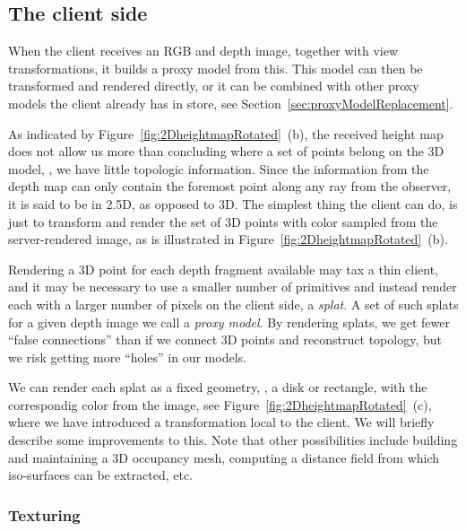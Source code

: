 \subsection{The client side}
\label{sec:client}

When the client receives an RGB and depth image, together with view
transformations, it builds a proxy model from this. This model can then be
transformed and rendered directly, or it can be combined with other proxy models
the client already has in store, see Section~\ref{sec:proxyModelReplacement}.

As indicated by Figure~\ref{fig:2DheightmapRotated}~(b), the received height map
does not allow us more than concluding where a set of points belong on the 3D
model, \ie, we have little topologic information. Since the information from the
depth map can only contain the foremost point along any ray from the observer,
it is said to be in 2.5D, as opposed to 3D.  The simplest thing the client can
do, is just to transform and render the set of 3D points with color sampled from
the server-rendered image, as is illustrated in
Figure~\ref{fig:2DheightmapRotated}~(b).

Rendering a 3D point for each depth fragment available may tax a thin client,
and it may be necessary to use a smaller number of primitives and instead render
each with a larger number of pixels on the client side, a {\em splat}.  A set of
such splats for a given depth image we call a {\em proxy model}. By rendering
splats, we get fewer ``false connections'' than if we connect 3D points and
reconstruct topology, but we risk getting more ``holes'' in our models.

We can render each splat as a fixed geometry, \eg, a disk or rectangle, with the
correspondig color from the image, see Figure~\ref{fig:2DheightmapRotated}~(c),
where we have introduced a transformation local to the client.  We will briefly
describe some improvements to this. Note that other possibilities include
building and maintaining a 3D occupancy mesh, computing a distance field from
which iso-surfaces can be extracted, etc.

\subsubsection{Texturing}

